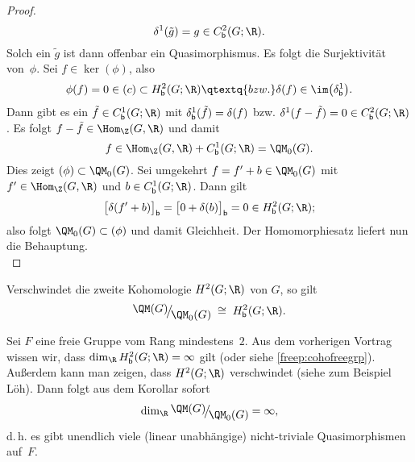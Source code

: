 \begin{proof}
\[            \delta^1(\tilde g) = g \in \Cb^2(G;\R)
    . \]
    Solch ein $\tilde g$ ist dann offenbar ein Quasimorphismus. Es folgt die
    Surjektivität von~$\phi$. Sei $f\in\ker(\phi)$, also
    \[ \phi(f) = 0 \in\ker(c) \subset \Hb^2(G;\R)  \qtextq{bzw.}
        \delta(f) \in \im\bigl(\delta^1_\bd\bigr)
    . \]
    Dann gibt es ein $\tilde f\in\Cb^1(G;\R)$ mit $\delta^1_{\mathsf{b}}(\tilde f)
    = \delta(f)$ bzw. $\delta^1(f - \tilde f) = 0 \in\Cb^2(G;\R)$.
    Es folgt $f - \tilde f \in\Hom_\Z(G,\R)$ und damit
    \[ f \in \Hom_\Z(G,\R) + \Cb^1(G;\R) = \QM_0(G)  . \]
    Dies zeigt $\ker(\phi) \subset \QM_0(G)$. Sei umgekehrt
    $f = f'+b \in\QM_0(G)$ mit $f'\in\Hom_\Z(G,\R)$ und $b\in\Cb^1(G;\R)$.
    Dann gilt
    \[ \bigl[\delta(f'+b)\bigr]_\bd 
        = \bigl[0 + \delta(b)\bigr]_\bd = 0 \in \Hb^2(G;\R)
    ; \]
    also folgt $\QM_0(G) \subset \ker(\phi)$ und damit Gleichheit. Der
    Homomorphiesatz liefert nun die Behauptung.
    \\
\end{proof}

\begin{thKorollar}
    Verschwindet die zweite Kohomologie $H^2(G;\R)$ von $G$, so gilt
    \[ \Quot{\QM(G)}{\QM_0(G)} \;\cong\; \Hb^2(G;\R)  . \]
\end{thKorollar}

\begin{thBeispiel}
    Sei $F$ eine freie Gruppe vom Rang mindestens~$2$. Aus dem vorherigen
    Vortrag wissen wir, %
    dass $\dim_{\R} \Hb^2(G;\R) = \infty$ gilt (oder siehe
    \cref{freep:cohofreegrp}). Außerdem kann man zeigen, dass $H^2(G;\R)$
    verschwindet (siehe zum Beispiel
    Löh\cite[Ch.\,1,.4,\;Example~1.3.13]{lecnotes:loeh:bdcoho}).
    Dann folgt aus dem Korollar sofort
    \[ \dim_{\R} \Quot{\QM(G)}{\QM_0(G)} = \infty  , \]
    d.\,h. es gibt unendlich viele (linear unabhängige) nicht-triviale
    Quasimorphismen auf~$F$.
\end{thBeispiel}

